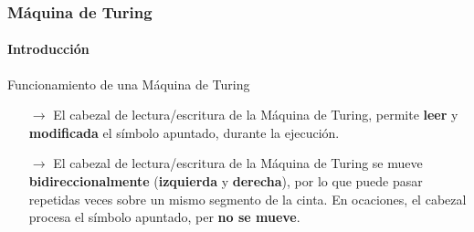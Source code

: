 \documentclass{beamer}
\begin{document}
        \begin{frame}
            \frametitle{M\'aquina de Turing}
            \framesubtitle{Introducci\'on}

			\begin{block}{Funcionamiento de una M\'aquina de Turing}
                \begin{itemize}
                    \item[$\rightarrow$] El cabezal de lectura/escritura de la M\'aquina de Turing, permite \textbf{leer} y \textbf{modificada} el s\'imbolo apuntado, durante la ejecuci\'on. 
                    \item[$\rightarrow$] El cabezal de lectura/escritura de la M\'aquina de Turing se mueve \textbf{bidireccionalmente} (\textbf{izquierda} y \textbf{derecha}), por lo que puede pasar repetidas veces sobre un mismo segmento de la cinta. En ocaciones, el cabezal procesa el s\'imbolo apuntado, per \textbf{no se mueve}.
                \end{itemize}
			\end{block}
		\end{frame}

%
\end{document}
